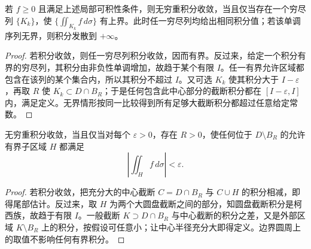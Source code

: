 \begin{theorem}[非负函数的有界性判据]
\label{thm:multiple-nonnegative-exhaustion}
若 $f\geq0$ 且满足上述局部可积性条件，则无穷重积分收敛，当且仅当存在一个穷尽列 $\{K_k\}$，使 $\{\iint_{K_k}f\,d\sigma\}$ 有上界。此时任一穷尽列均给出相同积分值；若该单调序列无界，则积分发散到 $+\infty$。
\end{theorem}
\begin{proof}
若积分收敛，则任一穷尽列积分收敛，因而有界。反过来，给定一个积分有界的穷尽列，其积分由非负性单调增加，故趋于某个有限 $I$。任一有界允许区域都包含在该列的某个集合内，所以其积分不超过 $I$。又可选 $K_k$ 使其积分大于 $I-\varepsilon$，再取 $R$ 使 $K_k\subset D\cap B_R$；于是任何包含此中心部分的截断积分都在 $[I-\varepsilon,I]$ 内，满足定义。无界情形按同一比较得到所有足够大截断积分都超过任意给定常数。
\end{proof}

\begin{proposition}[柯西尾部判据]
\label{prop:multiple-improper-cauchy}
无穷重积分收敛，当且仅当对每个 $\varepsilon>0$，存在 $R>0$，使任何位于 $D\setminus B_R$ 的允许有界子区域 $H$ 都满足
\begin{equation}
    \left|\iint_Hf\,d\sigma\right|<\varepsilon.
    \label{eq:multiple-improper-cauchy}
\end{equation}
\end{proposition}
\begin{proof}
若积分收敛，把充分大的中心截断 $C=D\cap B_R$ 与 $C\cup H$ 的积分相减，即得尾部估计。反过来，取 $H$ 为两个大圆盘截断之间的部分，知圆盘截断积分是柯西族，故趋于有限 $I$。一般截断 $K\supset D\cap B_R$ 与中心截断的积分之差，又是外部区域 $K\setminus B_R$ 上的积分，按假设可任意小；让中心半径充分大即得定义。边界圆周上的取值不影响任何有界积分。
\end{proof}


